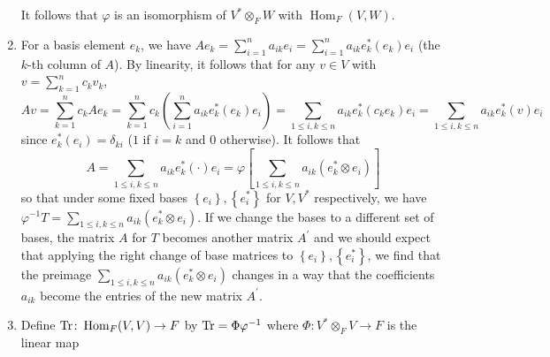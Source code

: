 \documentclass[11pt]{article}
\newcommand{\br}[1]{\left(#1\right)}
\newcommand{\sbr}[1]{\left[#1\right]}
\newcommand{\cbr}[1]{\left\{#1\right\}}
\DeclareMathOperator{\Hom}{Hom}
\begin{document}
\begin{enumerate}[label=(\alph*)]
    It follows that $\varphi$ is an isomorphism of $V^\ast\otimes_F W$ with $\Hom_F(V,W)$.
    \item For a basis element $e_k$, we have $Ae_k = \sum_{i=1}^n a_{ik}e_i = \sum_{i=1}^n a_{ik}e^\ast_k(e_k)e_i$ (the $k$-th column of $A$). By linearity, it follows that for any $v\in V$ with $v = \sum_{k=1}^nc_kv_k$, \[Av = \sum_{k=1}^n c_k Ae_k = \sum_{k=1}^n c_k \br{\sum_{i=1}^n a_{ik}e^\ast_k(e_k)e_i} = \sum_{1\leq i,k\leq n} a_{ik}e^\ast_k(c_ke_k)e_i = \sum_{1\leq i,k\leq n} a_{ik}e^\ast_k(v)e_i\] since $e^\ast_k(e_i) = \delta_{ki}$ ($1$ if $i=k$ and $0$ otherwise). It follows that \[A = \sum_{1\leq i,k\leq n} a_{ik}e^\ast_k(\cdot)e_i = \varphi\sbr{\sum_{1\leq i,k\leq n} a_{ik}(e^\ast_k\otimes e_i)}\] so that under some fixed bases $\cbr{e_i},\cbr{e_i^\ast}$ for $V,V^\ast$ respectively, we have $\varphi^{-1}T = \sum_{1\leq i,k\leq n} a_{ik}(e^\ast_k\otimes e_i)$. If we change the bases to a different set of bases, the matrix $A$ for $T$ becomes another matrix $A^\prime$ and we should expect that applying the right change of base matrices to $\cbr{e_i},\cbr{e_i^\ast}$, we find that the preimage $\sum_{1\leq i,k\leq n} a_{ik}(e^\ast_k\otimes e_i)$ changes in a way that the coefficients $a_{ik}$ become the entries of the new matrix $A^\prime$.
    \item Define $\Tr\colon \Hom_F(V,V)\to F$ by $\Tr = \Phi\varphi^{-1}$ where $\Phi\colon V^\ast\otimes_F V\to F$ is the linear map 
\end{enumerate}
\end{document}
